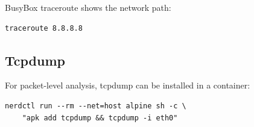 BusyBox traceroute shows the network path:

\begin{lstlisting}
traceroute 8.8.8.8
\end{lstlisting}

\subsection{Tcpdump}

For packet-level analysis, tcpdump can be installed in a container:

\begin{lstlisting}
nerdctl run --rm --net=host alpine sh -c \
    "apk add tcpdump && tcpdump -i eth0"
\end{lstlisting}
